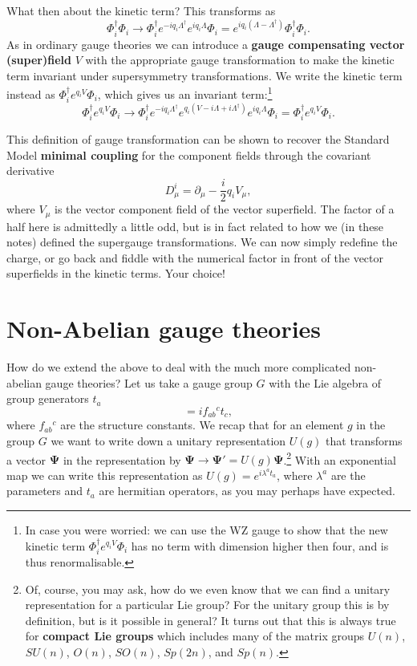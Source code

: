 \documentclass[notes.tex]{subfiles}
\begin{document}
What then about the kinetic term? This transforms as
\[\Phi^\dagger_i\Phi_i \to \Phi^\dagger_i e^{-iq_i\Lambda^\dagger }e^{iq_i\Lambda }\Phi_i = e^{iq_i(\Lambda - \Lambda^\dagger)}\Phi^\dagger_i\Phi_i.\]
As in  ordinary gauge theories we can introduce a {\bf gauge compensating vector (super)field} $V$ with the appropriate gauge transformation to make the kinetic term invariant under supersymmetry transformations. We write the kinetic term instead as $\Phi^\dagger_i e^{q_iV}\Phi_i$, which gives us an invariant term:\footnote{In case you were worried: we can use the WZ gauge to show that the new kinetic term $ \Phi^\dagger_ie^{q_iV}\Phi_i$ has no term with dimension higher then four, and is thus renormalisable.}
\[\Phi^\dagger_ie^{q_iV}\Phi_i \to \Phi^\dagger_i e^{-iq_i\Lambda^\dagger }e^{q_i(V - i\Lambda + i\Lambda^\dagger)}e^{iq_i\Lambda}\Phi_i = \Phi^\dagger_ie^{q_iV}\Phi_i.\]

This definition of gauge transformation can be shown to recover the Standard  Model {\bf minimal coupling} for the component fields through the covariant derivative
\[D_\mu^i = \partial_\mu -\frac{i}{2}q_iV_\mu,\]
where $V_\mu$ is the vector component field of the vector superfield. The factor of a half here is admittedly a little odd, but is in fact related to how we (in these notes) defined the supergauge transformations. We can now simply redefine the charge, or go back and fiddle with the numerical factor in front of the vector superfields in the kinetic terms. Your choice!


\section{Non-Abelian gauge theories}
How do we extend the above to deal with the much more complicated non-abelian gauge theories? Let us take a gauge group $G$ with the Lie algebra of group generators $t_a$ 
\begin{equation}
[t_a, t_b] = if_{ab}{}^c t_c,\label{eq:Liealgebrawta}
\end{equation} 
where $f_{ab}{}^{c}$ are the structure constants. We recap that for an element $g$ in the group $G$ we want to write down a unitary representation $U(g)$ that transforms a vector $\boldsymbol\Psi$  in the representation by $\boldsymbol\Psi \to \boldsymbol\Psi' = U(g)\boldsymbol\Psi$.\footnote{Of, course, you may ask, how do we even know that we can find a unitary representation for a particular Lie group? For the unitary group this is by definition, but is it possible in general? It turns out that this is always true for {\bf compact Lie groups} which includes many of the matrix groups $U(n)$, $SU(n)$, $O(n)$, $SO(n)$, $Sp(2n)$, and $Sp(n)$.}  
With an exponential map we can write this representation as $U(g) = e^{i\lambda^a t_a}$, where $\lambda^a$ are the parameters and $t_a$ are hermitian operators, as you may perhaps have expected.
\end{document}
